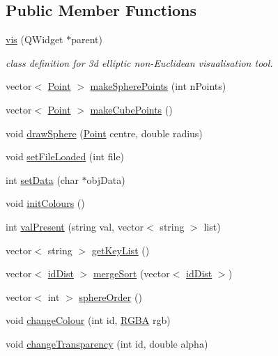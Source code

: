 \subsection*{Public Member Functions}
\begin{DoxyCompactItemize}
\item 
\mbox{\hyperlink{classvis_a996ee5697c4a48f0c9ae5743449fc69d}{vis}} (Q\+Widget $\ast$parent)
\begin{DoxyCompactList}\small\item\em class definition for 3d elliptic non-\/Euclidean visualisation tool. \end{DoxyCompactList}\item 
vector$<$ \mbox{\hyperlink{struct_point}{Point}} $>$ \mbox{\hyperlink{classvis_a9953ea49c09b9acec704d8175cb7865e}{make\+Sphere\+Points}} (int n\+Points)
\item 
vector$<$ \mbox{\hyperlink{struct_point}{Point}} $>$ \mbox{\hyperlink{classvis_a5648b70ed8383268114b338cf020c9d9}{make\+Cube\+Points}} ()
\item 
void \mbox{\hyperlink{classvis_a462f90942b36607561139dbcf4e6dabb}{draw\+Sphere}} (\mbox{\hyperlink{struct_point}{Point}} centre, double radius)
\item 
void \mbox{\hyperlink{classvis_a49b2f075d0ee40e1baced4f1d7bf9cb7}{set\+File\+Loaded}} (int file)
\item 
int \mbox{\hyperlink{classvis_adef138ed751afac0d06a8b6d7e206255}{set\+Data}} (char $\ast$obj\+Data)
\item 
void \mbox{\hyperlink{classvis_a3084a34dc367afa2d5d723e7e5a8fe47}{init\+Colours}} ()
\item 
int \mbox{\hyperlink{classvis_a89dba18d9f27f573ea2f30bfe4b3dc03}{val\+Present}} (string val, vector$<$ string $>$ list)
\item 
vector$<$ string $>$ \mbox{\hyperlink{classvis_a4802cc95e28174087be125f61a31ef60}{get\+Key\+List}} ()
\item 
vector$<$ \mbox{\hyperlink{structid_dist}{id\+Dist}} $>$ \mbox{\hyperlink{classvis_a6da50dd6a74fcba4055c2032b457c829}{merge\+Sort}} (vector$<$ \mbox{\hyperlink{structid_dist}{id\+Dist}} $>$)
\item 
vector$<$ int $>$ \mbox{\hyperlink{classvis_a250353e36f42fd058d6b59692356d29a}{sphere\+Order}} ()
\item 
void \mbox{\hyperlink{classvis_a4c13659b0c56047739c82f04a3dd317c}{change\+Colour}} (int id, \mbox{\hyperlink{struct_r_g_b_a}{R\+G\+BA}} rgb)
\item 
void \mbox{\hyperlink{classvis_a430b507667b18e74b1a6f1b68377c1f8}{change\+Transparency}} (int id, double alpha)

\end{DoxyCompactItemize}

